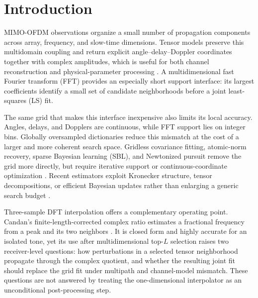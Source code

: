\section{Introduction}

MIMO-OFDM observations organize a small number of propagation components across array, frequency, and slow-time dimensions. Tensor models preserve this multidomain coupling and return explicit angle--delay--Doppler coordinates together with complex amplitudes, which is useful for both channel reconstruction and physical-parameter processing \cite{sidiropoulos2000parallel,kolda2009tensor,qian2018tensor_dual_polarized,kofidis2020tensor_multicarrier,gong2023esprit_tensor_train,wang2024irs_nlos_ofdm}. A multidimensional fast Fourier transform (FFT) provides an especially short support interface: its largest coefficients identify a small set of candidate neighborhoods before a joint least-squares (LS) fit.

The same grid that makes this interface inexpensive also limits its local accuracy. Angles, delays, and Dopplers are continuous, while FFT support lies on integer bins. Globally oversampled dictionaries reduce this mismatch at the cost of a larger and more coherent search space. Gridless covariance fitting, atomic-norm recovery, sparse Bayesian learning (SBL), and Newtonized pursuit remove the grid more directly, but require iterative support or continuous-coordinate optimization \cite{stoica2011spice,yang2013ogsbi,mamandipoor2016nomp,wu2023gridless_multifrequency,pote2023ml_gridless,wu2024nonuniform_gridless,wu2024coffee,pote2025lws_sbl}. Recent estimators exploit Kronecker structure, tensor decompositions, or efficient Bayesian updates rather than enlarging a generic search budget \cite{he2025offgrid_kronecker,chen2025structured_tensor_fdd,dealmeida2025bdris_tensor,cao2026offgrid_tucker,moderl2025fast_bsbl}.

Three-sample DFT interpolation offers a complementary operating point. Candan's finite-length-corrected complex ratio estimates a fractional frequency from a peak and its two neighbors \cite{candan2011three_dft}. It is closed form and highly accurate for an isolated tone, yet its use after multidimensional top-$L$ selection raises two receiver-level questions: how perturbations in a selected tensor neighborhood propagate through the complex quotient, and whether the resulting joint fit should replace the grid fit under multipath and channel-model mismatch. These questions are not answered by treating the one-dimensional interpolator as an unconditional post-processing step.


